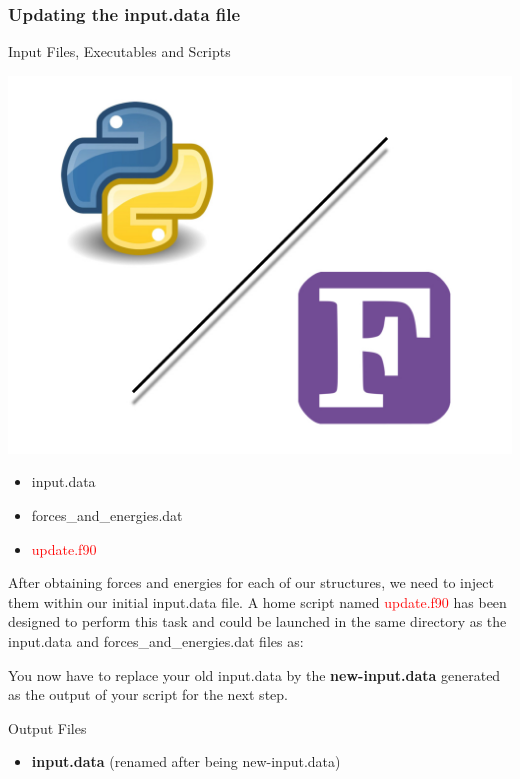 \documentclass[12pt]{article}
\begin{document}
\subsubsection{Updating the input.data file}
\begin{mybox2}{{Input Files, Executables and Scripts}}
\begin{minipage}[c]{0.5\linewidth}
\includegraphics[scale=0.1]{Python-fortran.jpeg}
\end{minipage}
\begin{minipage}[c]{0.5\linewidth}
\begin{itemize}
    \item input.data
    \item forces\_and\_energies.dat
    \item \textcolor{red}{update.f90}
\end{itemize}
\end{minipage}
\end{mybox2}
After obtaining forces and energies for each of our structures, we need to inject them within our initial input.data file. A home script named \textcolor{red}{update.f90} has been designed to perform this task and could be launched in the same directory as the input.data and forces\_and\_energies.dat files as:
\begin{center}
\end{center}
You now have to replace your old input.data by the \textbf{new-input.data} generated as the output of your script for the next step.
\\
\begin{mybox3}{Output Files}
\begin{itemize}
    \item \textbf{input.data} (renamed after being new-input.data)
\end{itemize}
\end{mybox3}
%
\end{document}
